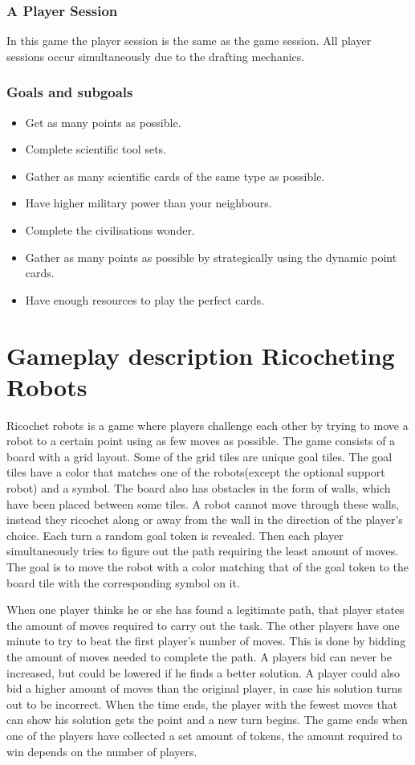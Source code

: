 \documentclass[a4paper]{article}
\begin{document}
\subsubsection{A Player Session}
In this game the player session is the same as the game session. All player sessions occur simultaneously due to the drafting mechanics.

\subsubsection{Goals and subgoals}
\begin{itemize}[noitemsep,topsep=0pt,parsep=0pt,partopsep=0pt]
  \item Get as many points as possible.
  \item Complete scientific tool sets.
  \item Gather as many scientific cards of the same type as possible.
  \item Have higher military power than your neighbours.
  \item Complete the civilisations wonder.
  \item Gather as many points as possible by strategically using the dynamic point cards.
  \item Have enough resources to play the perfect cards.
\end{itemize}
\section{Gameplay description Ricocheting Robots}
Ricochet robots is a game where players challenge each other by trying to move a robot to a certain point using as few moves as possible.
The game consists of a board with a grid layout. Some of the grid tiles are unique goal tiles.
The goal tiles have a color that matches one of the robots(except the optional support robot) and a symbol.
The board also has obstacles in the form of walls, which have been placed between some tiles. A robot cannot move through these walls, instead they ricochet along or away from the wall in the direction of the player's choice.
Each turn a random goal token is revealed.
Then each player simultaneously tries to figure out the path requiring the least amount of moves.
The goal is to move the robot with a color matching that of the goal token to the board tile with the corresponding symbol on it. 

When one player thinks he or she has found a legitimate path, that player states the amount of moves required to carry out the task.
The other players have one minute to try to beat the first player's number of moves. This is done by bidding the amount of moves needed to complete the path. A players bid can never be increased, but could be lowered if he finds a better solution. A player could also bid a higher amount of moves than the original player, in case his solution turns out to be incorrect.
When the time ends, the player with the fewest moves that can show his solution gets the point and a new turn begins.
The game ends when one of the players have collected a set amount of tokens, the amount required to win depends on the number of players.
\end{document}
